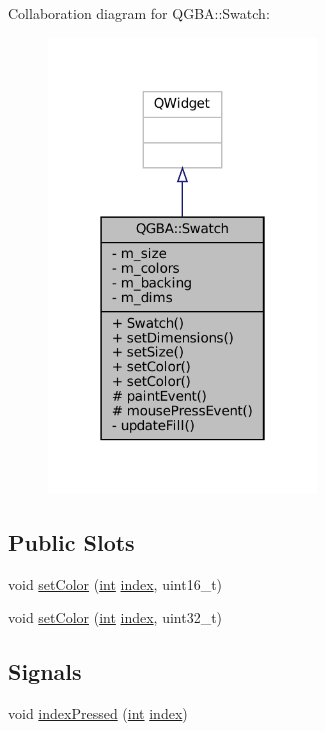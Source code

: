 Collaboration diagram for Q\+G\+BA\+:\+:Swatch\+:
\nopagebreak
\begin{figure}[H]
\begin{center}
\leavevmode
\includegraphics[width=202pt]{class_q_g_b_a_1_1_swatch__coll__graph}
\end{center}
\end{figure}
\subsection*{Public Slots}
\begin{DoxyCompactItemize}
\item 
void \mbox{\hyperlink{class_q_g_b_a_1_1_swatch_a862505bc67be02d4c43418cfe67bedd4}{set\+Color}} (\mbox{\hyperlink{ioapi_8h_a787fa3cf048117ba7123753c1e74fcd6}{int}} \mbox{\hyperlink{isa-lr35902_8c_ac9ee548085af12859cb52a6c757cf73a}{index}}, uint16\+\_\+t)
\item 
void \mbox{\hyperlink{class_q_g_b_a_1_1_swatch_a15aa3d0793ab2ba0b8fba0dda9ec039a}{set\+Color}} (\mbox{\hyperlink{ioapi_8h_a787fa3cf048117ba7123753c1e74fcd6}{int}} \mbox{\hyperlink{isa-lr35902_8c_ac9ee548085af12859cb52a6c757cf73a}{index}}, uint32\+\_\+t)
\end{DoxyCompactItemize}
\subsection*{Signals}
\begin{DoxyCompactItemize}
\item 
void \mbox{\hyperlink{class_q_g_b_a_1_1_swatch_a35af6511c4d2750347c7bcc406cc1137}{index\+Pressed}} (\mbox{\hyperlink{ioapi_8h_a787fa3cf048117ba7123753c1e74fcd6}{int}} \mbox{\hyperlink{isa-lr35902_8c_ac9ee548085af12859cb52a6c757cf73a}{index}})
\end{DoxyCompactItemize}
